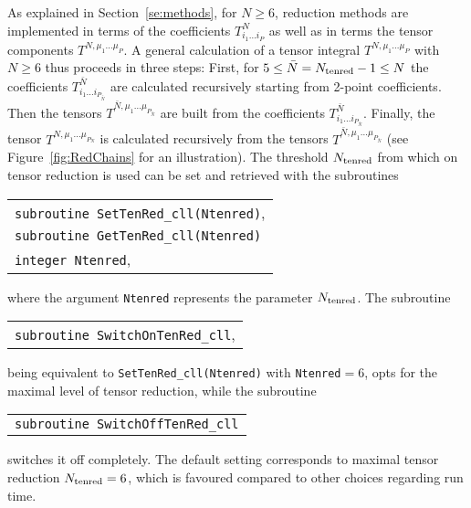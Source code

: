 \documentclass[preprint,sort&compress,12pt]{elsarticle}
\makeatletter
\def\bce{\begin{center}}
\def\ece{\end{center}}
\def\reffi#1{\mbox{Figure~\ref{#1}}}
\def\refse#1{\mbox{Section~\ref{#1}}}
\newlength{\parwidth}\newlength{\colonewidth}%
\newcommand{\cpcsub}[1]
{%
\setlength{\parwidth}{\textwidth}\addtolength{\parwidth}{-2.1em}%
\bce
\begin{tabular}[t]{@{}p{\parwidth}@{}}
#1
\end{tabular}
\ece
}%
\makeatother
\begin{document}
As explained in \refse{se:methods}, for $N\ge 6$, reduction methods
are implemented in terms of the coefficients $T^{N}_{i_1\dots i_P}$ as
well as in terms the tensor components $T^{N,\mu_1\dots \mu_P}$. A
general calculation of a tensor integral $T^{N,\mu_1\dots \mu_P}$ with
$N\ge 6$ thus proceeds in three steps:
First, for $5\le \bar{N}=N_{\rm tenred}-1\le N$ the coefficients 
$T^{\bar{N}}_{i_1\dots i_{P_{\bar{N}}}}$ 
are calculated recursively
starting from 2-point coefficients. Then 
the tensors $T^{\bar{N},\mu_1\dots \mu_{P_{\bar{N}}}}$ are built from the coefficients 
$T^{\bar{N}}_{i_1\dots i_{P_{\bar{N}}}}$. Finally, the
tensor $T^{N,\mu_1\dots \mu_{P_{N}}}$ is calculated recursively from the tensors 
$T^{\bar{N},\mu_1\dots \mu_{P_{\bar{N}}}}$ (see \reffi{fig:RedChains}
for an illustration).
The threshold $N_{\rm tenred}$ from which on tensor reduction is used can be set and retrieved with the subroutines
\cpcsub{
{\tt subroutine  SetTenRed\_cll(Ntenred)}\;,\\
{\tt subroutine  GetTenRed\_cll(Ntenred)} \\
{\tt integer Ntenred}\;, \\
}
where the argument {\tt Ntenred} 
represents the parameter $N_{\rm tenred}$. The subroutine
\cpcsub{
{\tt subroutine  SwitchOnTenRed\_cll},
}
being equivalent to {\tt SetTenRed\_cll(Ntenred)} with {\tt Ntenred${=}6$},
opts for the maximal level of 
tensor reduction, while the subroutine
\cpcsub{
{\tt subroutine  SwitchOffTenRed\_cll}
}
switches it off completely. The default setting corresponds to maximal tensor reduction $N_{\rm tenred}=6$, 
which is favoured compared to other choices regarding run time.
\end{document}
